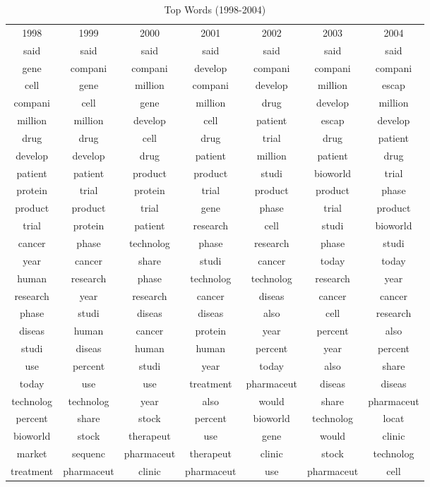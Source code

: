 \begin{table}
\footnotesize
\begin{center}
\caption[Top Words (1998-2004)]{Top Words (1998-2004) \label{topwords2}}
\vspace{0.3in}
\begin{tabular}{ccccccc}
\hline 
\hline
1998 & 1999 & 2000 & 2001 & 2002 & 2003 & 2004 \\
said & said & said & said & said & said & said \\
gene & compani & compani & develop & compani & compani & compani \\
cell & gene & million & compani & develop & million & escap \\
compani & cell & gene & million & drug & develop & million \\
million & million & develop & cell & patient & escap & develop \\
drug & drug & cell & drug & trial & drug & patient \\
develop & develop & drug & patient & million & patient & drug \\
patient & patient & product & product & studi & bioworld & trial \\
protein & trial & protein & trial & product & product & phase \\
product & product & trial & gene & phase & trial & product \\
trial & protein & patient & research & cell & studi & bioworld \\
cancer & phase & technolog & phase & research & phase & studi \\
year & cancer & share & studi & cancer & today & today \\
human & research & phase & technolog & technolog & research & year \\
research & year & research & cancer & diseas & cancer & cancer \\
phase & studi & diseas & diseas & also & cell & research \\
diseas & human & cancer & protein & year & percent & also \\
studi & diseas & human & human & percent & year & percent \\
use & percent & studi & year & today & also & share \\
today & use & use & treatment & pharmaceut & diseas & diseas \\
technolog & technolog & year & also & would & share & pharmaceut \\
percent & share & stock & percent & bioworld & technolog & locat \\
bioworld & stock & therapeut & use & gene & would & clinic \\
market & sequenc & pharmaceut & therapeut & clinic & stock & technolog \\
treatment & pharmaceut & clinic & pharmaceut & use & pharmaceut & cell \\
\hline
\end{tabular}
\end{center}
\end{table}


